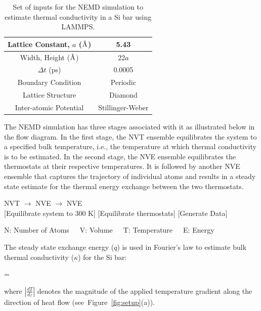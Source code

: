\begin{table}[htbp]
\begin{center}
\begin{tabular}{|c||c|}
\hline
Lattice Constant, $a$ ($\mbox{\normalfont\AA}$) & 5.43 \\ \hline
Width, Height ($\mbox{\normalfont\AA}$) & 22$a$ \\ \hline
$\Delta t$  (ps) & 0.0005 \\ \hline
Boundary Condition & Periodic \\ \hline
Lattice Structure & Diamond \\ \hline
Inter-atomic Potential & Stillinger-Weber \\ 
\hline
\end{tabular}
\end{center}
\label{tab:input}
\caption{Set of inputs for the NEMD simulation to estimate thermal conductivity in a Si bar using LAMMPS.}
\end{table}

The NEMD simulation has three stages associated with it as illustrated below in the flow diagram. In the
first stage, the NVT ensemble equilibrates the system to a specified bulk temperature, i.e., the temperature
at which thermal conductivity is to be estimated. In the second stage, the NVE ensemble equilibrates the
thermostats at their respective temperatures. It is followed by another NVE ensemble that captures the
trajectory of individual atoms and results in a steady state estimate for the thermal energy exchange between
the two thermostats. 

\begin{center}

NVT \hspace{5mm} $\rightarrow$ \hspace{5mm} NVE \hspace{5mm}
$\rightarrow$ \hspace{5mm} NVE
\\ \vspace{1mm}
\tiny \hspace{-5mm}[Equilibrate system to 300 K] \hspace{1mm} [Equilibrate thermostats] \hspace{4mm}
 [Generate Data]
\\ \vspace{1mm}

\tiny{N: Number of Atoms~~~V: Volume~~~T: Temperature~~~E: Energy}
\end{center}

The steady state exchange energy ($q$) is used in Fourier's law to estimate bulk thermal conductivity ($\kappa$)
for the Si  bar:

\be
 \kappa =  
\ee

\noindent where $\left|\frac{dT}{dz}\right|$ denotes the magnitude of the applied temperature gradient along the 
direction of heat flow (see~Figure~\ref{fig:setup}(a)).





























